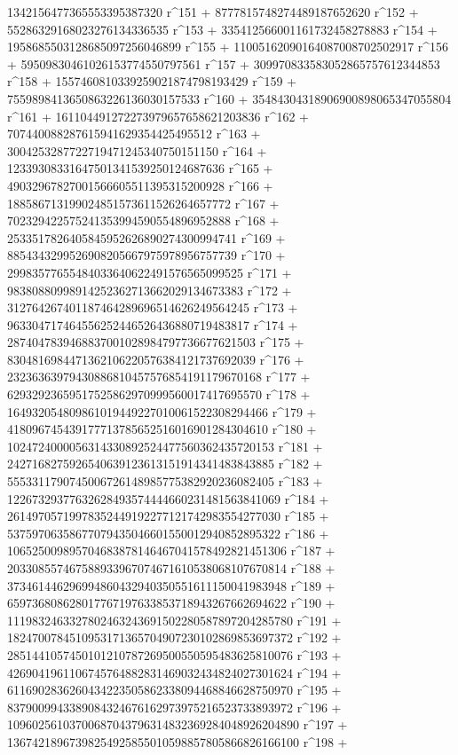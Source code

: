       1342156477365553395387320 r^151 + 
       8777815748274489187652620 r^152 + 
       55286329168023276134336535 r^153 + 
       335412566001161732458278883 r^154 + 
       1958685503128685097256046899 r^155 + 
       11005162090164087008702502917 r^156 + 
       59509830461026153774550797561 r^157 + 
       309970833583052865757612344853 r^158 + 
       1557460810339259021874798193429 r^159 + 
       7559898413650863226136030157533 r^160 + 
       35484304318906900898065347055804 r^161 + 
       161104491272273979657658621203836 r^162 + 
       707440088287615941629354425495512 r^163 + 
       3004253287722719471245340750151150 r^164 + 
       12339308331647501341539250124687636 r^165 + 
       49032967827001566605511395315200928 r^166 + 
       188586713199024851573611526264657772 r^167 + 
       702329422575241353994590554896952888 r^168 + 
       2533517826405845952626890274300994741 r^169 + 
       8854343299526908205667975978956757739 r^170 + 
       29983577655484033640622491576565099525 r^171 + 
       98380880998914252362713662029134673383 r^172 + 
       312764267401187464289696514626249564245 r^173 + 
       963304717464556252446526436880719483817 r^174 + 
       2874047839468837001028984797736677621503 r^175 + 
       8304816984471362106220576384121737692039 r^176 + 
       23236363979430886810457576854191179670168 r^177 + 
       62932923659517525862970999560017417695570 r^178 + 
       164932054809861019449227010061522308294466 r^179 + 
       418096745439177713785652516016901284304610 r^180 + 
       1024724000056314330892524477560362435720153 r^181 + 
       2427168275926540639123613151914341483843885 r^182 + 
       5553311790745006726148985775382920236082405 r^183 + 
       12267329377632628493574444660231481563841069 r^184 + 
       26149705719978352449192277121742983554277030 r^185 + 
       53759706358677079435046601550012940852895322 r^186 + 
       106525009895704683878146467041578492821451306 r^187 + 
       203308557467588933967074671610538068107670814 r^188 + 
       373461446296994860432940350551611150041983948 r^189 + 
       659736808628017767197633853718943267662694622 r^190 + 
       1119832463327802463243691502280587897204285780 r^191 + 
       1824700784510953171365704907230102869853697372 r^192 + 
       2851441057450101210787269500550595483625810076 r^193 + 
       4269041961106745764882831469032434824027301624 r^194 + 
       6116902836260434223505862338094468846628750970 r^195 + 
       8379009943389084324676162973975216523733893972 r^196 + 
       10960256103700687043796314832369284048926204890 r^197 + 
       13674218967398254925855010598857805866826166100 r^198 + 
